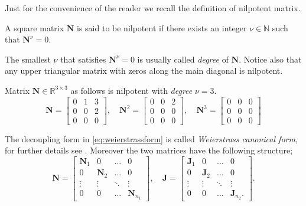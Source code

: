 		Just for the convenience of the reader we recall the definition of nilpotent matrix.
		\begin{definition}
			A square matrix $\bm{N}$ is said to be nilpotent if there exists an integer $\nu\in\mathbb{N}$ such that $\bm{N}^{\nu} = 0$.
		\end{definition}
		\begin{remark}
			The smallest $\nu$ that satisfies $\bm{N}^{\nu} = 0$ is usually called \emph{degree} of $\bm{N}$. Notice also that any upper triangular matrix with zeros along the main diagonal is nilpotent.
		\end{remark}
		\begin{example}
			Matrix $\bm{N}\in\mathbb{R}^{3\times 3}$ as follows is nilpotent with \emph{degree} $\nu = 3$.
			\begin{equation}
				\bm{N} = 
				\begin{bmatrix}
					0 & 1 & 3 \\
					0 & 0 & 2 \\
					0 & 0 & 0
				\end{bmatrix}, \quad
				\bm{N}^2 = 
				\begin{bmatrix}
					0 & 0 & 2 \\
					0 & 0 & 0 \\
					0 & 0 & 0
				\end{bmatrix}, \quad 
				\bm{N}^3 =
				\begin{bmatrix}
					0 & 0 & 0 \\
					0 & 0 & 0 \\
					0 & 0 & 0 
				\end{bmatrix}
			\end{equation}
		\end{example}
		The decoupling form in \cref{eq:weierstrassform} is called \emph{Weierstrass canonical form}, for further details see \cite{gantmacher1964theory}. Moreover the two matrices have the following structure; 
		\begin{equation}
			\bm{N} = 
			\begin{bmatrix}
				\bm{N}_{1} & 0 & \dots & 0 \\
				0 & \bm{N}_{2} & \dots & 0 \\
				\vdots & \vdots & \ddots & \vdots\\
				0 & 0 & \dots & \bm{N}_{n_{1}}	
			\end{bmatrix},\quad
			\bm{J} =
			\begin{bmatrix}
				\bm{J}_{1} & 0 & \dots & 0 \\
				0 & \bm{J}_{2} & \dots & 0 \\
				\vdots & \vdots & \ddots & \vdots\\
				0 & 0 & \dots & \bm{J}_{n_{2}}.
			\end{bmatrix}.
		\end{equation}
